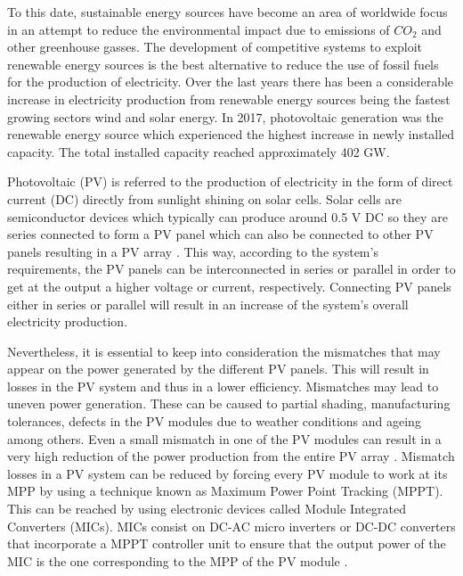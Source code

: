 To this date, sustainable energy sources have become an area of worldwide focus in an attempt to reduce the environmental impact due to emissions of $CO_{2}$ and other greenhouse gasses. The development of competitive systems to exploit renewable energy sources is the best alternative to reduce the use of fossil fuels for the production of electricity. Over the last years there has been a considerable increase in electricity production from renewable energy sources being the fastest growing sectors wind and solar energy. In 2017, photovoltaic generation was the renewable energy source which experienced the highest increase in newly installed capacity. The total installed capacity reached approximately 402 GW\cite{global}. %

Photovoltaic (PV) is referred to the production of electricity in the form of direct current (DC) directly from sunlight shining on solar cells. Solar cells are semiconductor devices which typically can produce around 0.5 V DC so they are series connected to form a PV panel which can also be connected to other PV panels resulting in a PV array \cite{handbook}. This way, according to the system's requirements, the PV panels can be interconnected in series or parallel in order to get at the output a higher voltage or current, respectively. Connecting PV panels either in series or parallel will result in an increase of the system's overall electricity production. %

Nevertheless, it is essential to keep into consideration the mismatches that may appear on the power generated by the different PV panels. This will result in losses in the PV system and thus in a lower efficiency. Mismatches may lead to uneven power generation. These can be caused to partial shading, manufacturing tolerances, defects in the PV modules due to weather conditions and ageing among others. Even a small mismatch in one of the PV modules can result in a very high reduction of the power production from the entire PV array \cite{MPPmismatch}. Mismatch losses in a PV system can be reduced by forcing every PV module to work at its MPP by using a technique known as Maximum Power Point Tracking (MPPT). This can be reached by using electronic devices called Module Integrated Converters (MICs). MICs consist on DC-AC micro inverters or DC-DC converters that incorporate a MPPT controller unit to ensure that the output power of the MIC is the one corresponding to the MPP of the PV module \cite{MPPmismatch}.%